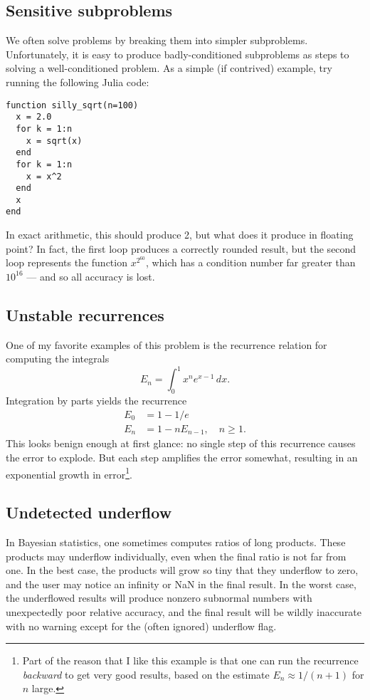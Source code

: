 \documentclass[12pt, leqno]{article} %
\begin{document}
\subsection{Sensitive subproblems}

We often solve problems by breaking them into simpler subproblems.
Unfortunately, it is easy to produce badly-conditioned subproblems
as steps to solving a well-conditioned problem.  As a simple (if
contrived) example, try running the following Julia code:

\begin{lstlisting}
function silly_sqrt(n=100)
  x = 2.0
  for k = 1:n
    x = sqrt(x)
  end
  for k = 1:n
    x = x^2
  end
  x
end
\end{lstlisting}

In exact arithmetic, this should produce 2, but what does it produce
in floating point?  In fact, the first loop produces a correctly
rounded result, but the second loop represents the function
$x^{2^{60}}$, which has a condition number far greater than $10^{16}$
--- and so all accuracy is lost.

\subsection{Unstable recurrences}

One of my favorite examples of this problem is the recurrence relation
for computing the integrals
\[
  E_n = \int_{0}^1 x^n e^{x-1} \, dx.
\]
Integration by parts yields the recurrence
\begin{align*}
  E_0 &= 1-1/e \\
  E_n &= 1-nE_{n-1}, \quad n \geq 1.
\end{align*}
This looks benign enough at first glance: no single step of
this recurrence causes the error to explode.  But
each step amplifies the error somewhat, resulting in an exponential
growth in error\footnote{%
Part of the reason that I like this example is that one can
run the recurrence {\em backward} to get very good results,
based on the estimate $E_n \approx 1/(n+1)$ for $n$ large.
}.

\subsection{Undetected underflow}

In Bayesian statistics, one sometimes computes ratios of long
products.  These products may underflow individually, even when the
final ratio is not far from one.  In the best case, the products will
grow so tiny that they underflow to zero, and the user may notice an
infinity or NaN in the final result.  In the worst case, the
underflowed results will produce nonzero subnormal numbers with
unexpectedly poor relative accuracy, and the final result will be
wildly inaccurate with no warning except for the (often ignored)
underflow flag.
\end{document}
